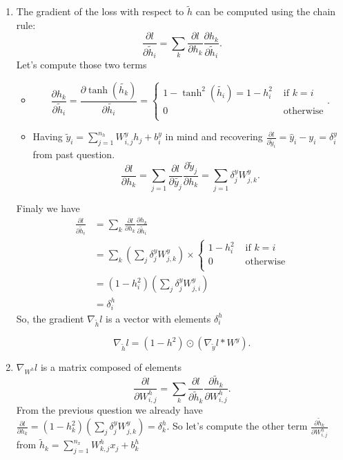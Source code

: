 \documentclass{article}
\theoremstyle{plain}%
\theoremstyle{definition}
\theoremstyle{remark}
\begin{document}
\begin{enumerate}
    \item The gradient of the loss with respect to \( \tilde{h} \) can be computed using the chain rule:
    \[
        \frac{\partial l}{\partial \tilde{h}_i} = \sum_{k}^{} \frac{\partial l}{\partial h_k} \frac{\partial h_k}{\partial \tilde{h}_i} 
    .\]
    Let's compute those two terms
    \begin{itemize}
        \item 
        \[
            \frac{\partial h_k}{\partial \tilde{h}_i} = \frac{\partial \tanh (\tilde{h_k})}{\partial \tilde{h_i}} = \begin{cases}
            1 - \tanh^2 (\tilde{h_i}) = 1 - h_i^2 &\text{ if } k = i\\
            0 &\text{ otherwise}\\
        \end{cases} 
    .\]
    
    \item Having $ \tilde{y}_i = \sum_{j=1}^{n_h} W_{i,j}^y h_j +b_i^y$ in mind and recovering $ \frac{\partial l}{\partial \tilde{y}_i} = \hat{y}_i - y_i = \delta ^y_i $ from past question.
    \[
        \frac{\partial l}{\partial h_k} = \sum_{j=1}^{} \frac{\partial l}{\partial \tilde{y_j}} \frac{\partial \tilde{y}_j}{\partial h_k} = \sum_{j=1}^{} \delta ^y_j W^y_{j,k}
    .\]
    \end{itemize}
    Finaly we have 
    \begin{align*}
        \frac{\partial l}{\partial \tilde{h}_i} &= \sum_{k}^{} \frac{\partial l}{\partial h_k} \frac{\partial h_k}{\partial \tilde{h}_i}  \\ 
        &= \sum_{k}^{} (\sum_{j}^{} \delta ^y_j W^y_{j,k}) \times \begin{cases}
            1 - h_i^2 &\text{ if } k = i\\
            0 &\text{ otherwise}\\
        \end{cases} \\
        &= (1 - h_i^2) (\sum_{j}^{} \delta ^y_j W^y_{j,i}) \\
        &= \delta ^h _i     
    \end{align*}
    So, the gradient \( \nabla _{\tilde{h}} l \) is a vector with elements $ \delta ^h _i $ 

    \[
        \nabla _{\tilde{h}} l = (1 - h^2) \odot (\nabla _{\tilde{y}} l * W^y)
    .\]


    \item $ \nabla _{W^h} l $ is a matrix composed of elements 
    \[
        \frac{\partial l}{\partial W^h _{i,j}} = \sum_{k}^{} \frac{\partial l}{\partial \tilde{h}_k} \frac{\partial \tilde{h}_k}{\partial W^h_{i,j}} 
    .\]
    From the previous question we already have $ \frac{\partial l}{\partial h_k} = (1 - h_k^2) (\sum_{j}^{} \delta ^y_j W^y_{j,k}) = \delta_k^h$. So let's compute the other term $ \frac{\partial \tilde{h}_k}{\partial W^h_{i,j}}  $ from $ \tilde{h}_k = \sum_{j=1}^{n_x} W^h_{k,j} x_j + b_k^h $ 
    

\end{enumerate}
\end{document}
